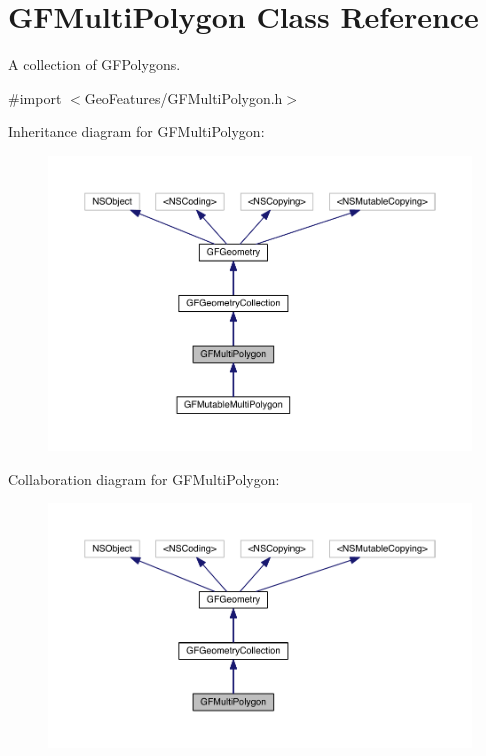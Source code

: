 \hypertarget{interface_g_f_multi_polygon}{}\section{G\+F\+Multi\+Polygon Class Reference}
\label{interface_g_f_multi_polygon}


A collection of G\+F\+Polygons.  




{\ttfamily \#import $<$Geo\+Features/\+G\+F\+Multi\+Polygon.\+h$>$}



Inheritance diagram for G\+F\+Multi\+Polygon\+:
\nopagebreak
\begin{figure}[H]
\begin{center}
\leavevmode
\includegraphics[width=350pt]{interface_g_f_multi_polygon__inherit__graph}
\end{center}
\end{figure}


Collaboration diagram for G\+F\+Multi\+Polygon\+:
\nopagebreak
\begin{figure}[H]
\begin{center}
\leavevmode
\includegraphics[width=350pt]{interface_g_f_multi_polygon__coll__graph}
\end{center}
\end{figure}

